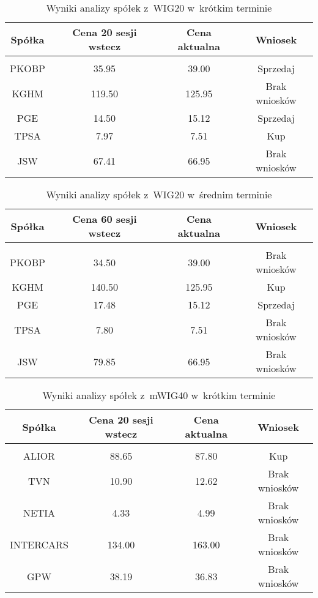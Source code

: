 \begin{table}[H]
	\centering
	\begin{tabular}{ c c c c}
	Spółka & Cena 20 sesji wstecz & Cena aktualna & Wniosek \\ \hline \\
	PKOBP & 35.95 & 39.00 & Sprzedaj \\
	KGHM & 119.50 & 125.95 & Brak wniosków \\
	PGE & 14.50 & 15.12 & Sprzedaj \\
	TPSA & 7.97 & 7.51 & Kup \\
	JSW & 67.41 & 66.95 & Brak wniosków \\
	\end{tabular}
	\caption{Wyniki analizy spółek z~WIG20 w~krótkim terminie}
\end{table}

\begin{table}[H]
	\centering
	\begin{tabular}{ c c c c}
	Spółka & Cena 60 sesji wstecz & Cena aktualna & Wniosek \\ \hline \\
	PKOBP & 34.50 & 39.00 & Brak wniosków \\
	KGHM & 140.50 & 125.95 & Kup \\
	PGE & 17.48 & 15.12 & Sprzedaj \\
	TPSA & 7.80 & 7.51 & Brak wniosków \\
	JSW & 79.85 & 66.95 & Brak wniosków \\
	\end{tabular}
	\caption{Wyniki analizy spółek z~WIG20 w~średnim terminie}
\end{table}

\begin{table}[H]
	\centering
	\begin{tabular}{ c c c c}
	Spółka & Cena 20 sesji wstecz & Cena aktualna & Wniosek \\ \hline \\
	ALIOR & 88.65 & 87.80 & Kup  \\
	TVN & 10.90 & 12.62 & Brak wniosków \\
	NETIA & 4.33 & 4.99 & Brak wniosków \\
	INTERCARS & 134.00 & 163.00 & Brak wniosków \\
	GPW & 38.19 & 36.83 & Brak wniosków \\
	\end{tabular}
	\caption{Wyniki analizy spółek z~mWIG40 w~krótkim terminie}
\end{table}

